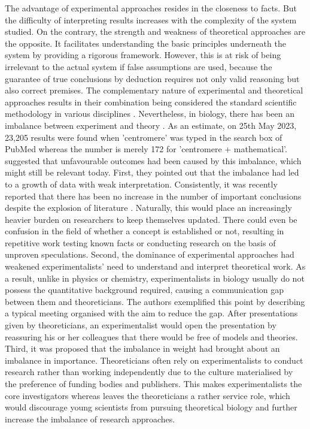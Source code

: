 The advantage of experimental approaches resides in the closeness to facts. But the difficulty of interpreting results increases with the complexity of the system studied. On the contrary, the strength and weakness of theoretical approaches are the opposite. It facilitates understanding the basic principles underneath the system by providing a rigorous framework. However, this is at risk of being irrelevant to the actual system if false assumptions are used, because the guarantee of true conclusions by deduction requires not only valid reasoning but also correct premises. The complementary nature of experimental and theoretical approaches results in their combination being considered the standard scientific methodology in various disciplines \citep{Platt1964StrongInference}. Nevertheless, in biology, there has been an imbalance between experiment and theory \citep{Fidelman1985TheModeling}. As an estimate, on 25th May 2023, 23,205 results were found when 'centromere' was typed in the search box of PubMed whereas the number is merely 172 for 'centromere + mathematical'. \cite{Fidelman1985TheModeling} suggested that unfavourable outcomes had been caused by this imbalance, which might still be relevant today. First, they pointed out that the imbalance had led to a growth of data with weak interpretation. Consistently, it was recently reported that there has been no increase in the number of important conclusions despite the explosion of literature \citep{Park2023PapersTime, Nurse2021BiologyData}. Naturally, this would place an increasingly heavier burden on researchers to keep themselves updated. There could even be confusion in the field of whether a concept is established or not, resulting in repetitive work testing known facts or conducting research on the basis of unproven speculations. Second, the dominance of experimental approaches had weakened experimentalists' need to understand and interpret theoretical work. As a result, unlike in physics or chemistry, experimentalists in biology usually do not possess the quantitative background required, causing a communication gap between them and theoreticians. The authors exemplified this point by describing a typical meeting organised with the aim to reduce the gap. After presentations given by theoreticians, an experimentalist would open the presentation by reassuring his or her colleagues that there would be free of models and theories. Third, it was proposed that the imbalance in weight had brought about an imbalance in importance. Theoreticians often rely on experimentalists to conduct research rather than working independently due to the culture materialised by the preference of funding bodies and publishers. This makes experimentalists the core investigators whereas leaves the theoreticians a rather service role, which would discourage young scientists from pursuing theoretical biology and further increase the imbalance of research approaches. 

